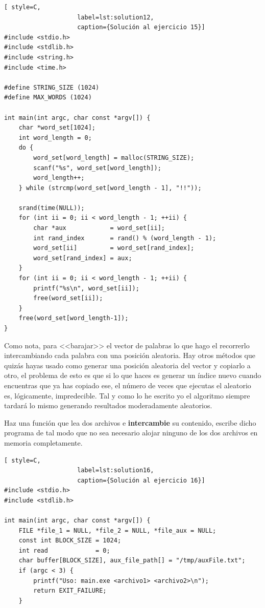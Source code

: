 \documentclass[a4paper]{article}
\begin{document}
\begin{exercises}
\noindent
\begin{minipage}[H]{\linewidth}
\mbox{}
\begin{lstlisting}[ style=C,
                    label=lst:solution12,
                    caption={Solución al ejercicio 15}]
#include <stdio.h>
#include <stdlib.h>
#include <string.h>
#include <time.h>

#define STRING_SIZE (1024)
#define MAX_WORDS (1024)

int main(int argc, char const *argv[]) {
    char *word_set[1024];
    int word_length = 0;
    do {
        word_set[word_length] = malloc(STRING_SIZE);
        scanf("%s", word_set[word_length]);
        word_length++;
    } while (strcmp(word_set[word_length - 1], "!!"));

    srand(time(NULL));
    for (int ii = 0; ii < word_length - 1; ++ii) {
        char *aux            = word_set[ii];
        int rand_index       = rand() % (word_length - 1);
        word_set[ii]         = word_set[rand_index];
        word_set[rand_index] = aux;
    }
    for (int ii = 0; ii < word_length - 1; ++ii) {
        printf("%s\n", word_set[ii]);
        free(word_set[ii]);
    }
    free(word_set[word_length-1]);
}
\end{lstlisting}
\end{minipage}

Como nota, para <<barajar>> el vector de palabras lo que hago el recorrerlo
intercambiando cada palabra con una posición aleatoria. Hay otros métodos
que quizás hayas usado como generar una posición aleatoria del vector y copiarlo
a otro, el problema de esto es que si lo que haces es generar un índice nuevo
cuando encuentras que ya has copiado ese, el número de veces que ejecutas
el aleatorio es, lógicamente, impredecible. Tal y como lo he escrito yo el
algoritmo siempre tardará lo mismo generando resultados moderadamente
aleatorios.

\item Haz una función que lea dos archivos e \textbf{intercambie} su contenido,
escribe dicho programa de tal modo que no sea necesario alojar ninguno de los
dos archivos en memoria completamente.

\newpage
\begin{lstlisting}[ style=C,
                    label=lst:solution16,
                    caption={Solución al ejercicio 16}]
#include <stdio.h>
#include <stdlib.h>

int main(int argc, char const *argv[]) {
    FILE *file_1 = NULL, *file_2 = NULL, *file_aux = NULL;
    const int BLOCK_SIZE = 1024;
    int read             = 0;
    char buffer[BLOCK_SIZE], aux_file_path[] = "/tmp/auxFile.txt";
    if (argc < 3) {
        printf("Uso: main.exe <archivo1> <archivo2>\n");
        return EXIT_FAILURE;
    }


\end{lstlisting}
\end{exercises}
\end{document}
